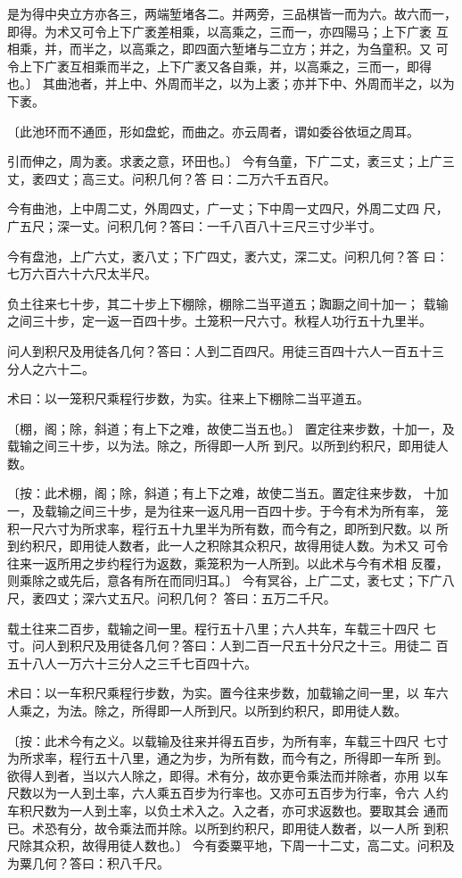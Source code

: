 \documentclass[a4paper,12pt,UTF8,twoside]{ctexbook}
\begin{document}
是为得中央立方亦各三，两端堑堵各二。并两旁，三品棋皆一而为六。故六而一， 即得。为术又可令上下广袤差相乘，以高乘之，三而一，亦四陽马；上下广袤 互相乘，并，而半之，以高乘之，即四面六堑堵与二立方；并之，为刍童积。又 可令上下广袤互相乘而半之，上下广袤又各自乘，并，以高乘之，三而一，即得 也。〕 其曲池者，并上中、外周而半之，以为上袤；亦并下中、外周而半之，以为 下袤。

〔此池环而不通匝，形如盘蛇，而曲之。亦云周者，谓如委谷依垣之周耳。

引而伸之，周为袤。求袤之意，环田也。〕 今有刍童，下广二丈，袤三丈；上广三丈，袤四丈；高三丈。问积几何？答 曰：二万六千五百尺。

今有曲池，上中周二丈，外周四丈，广一丈；下中周一丈四尺，外周二丈四 尺，广五尺；深一丈。问积几何？答曰：一千八百八十三尺三寸少半寸。

今有盘池，上广六丈，袤八丈；下广四丈，袤六丈，深二丈。问积几何？答 曰：七万六百六十六尺太半尺。

负土往来七十步，其二十步上下棚除，棚除二当平道五；踟蹰之间十加一； 载输之间三十步，定一返一百四十步。土笼积一尺六寸。秋程人功行五十九里半。

问人到积尺及用徒各几何？答曰：人到二百四尺。用徒三百四十六人一百五十三 分人之六十二。

术曰：以一笼积尺乘程行步数，为实。往来上下棚除二当平道五。

〔棚，阁；除，斜道；有上下之难，故使二当五也。〕 置定往来步数，十加一，及载输之间三十步，以为法。除之，所得即一人所 到尺。以所到约积尺，即用徒人数。

〔按：此术棚，阁；除，斜道；有上下之难，故使二当五。置定往来步数， 十加一，及载输之间三十步，是为往来一返凡用一百四十步。于今有术为所有率， 笼积一尺六寸为所求率，程行五十九里半为所有数，而今有之，即所到尺数。以 所到约积尺，即用徒人数者，此一人之积除其众积尺，故得用徒人数。为术又 可令往来一返所用之步约程行为返数，乘笼积为一人所到。以此术与今有术相 反覆，则乘除之或先后，意各有所在而同归耳。〕 今有冥谷，上广二丈，袤七丈；下广八尺，袤四丈；深六丈五尺。问积几何？ 答曰：五万二千尺。

载土往来二百步，载输之间一里。程行五十八里；六人共车，车载三十四尺 七寸。问人到积尺及用徒各几何？答曰：人到二百一尺五十分尺之十三。用徒二 百五十八人一万六十三分人之三千七百四十六。

术曰：以一车积尺乘程行步数，为实。置今往来步数，加载输之间一里，以 车六人乘之，为法。除之，所得即一人所到尺。以所到约积尺，即用徒人数。

〔按：此术今有之义。以载输及往来并得五百步，为所有率，车载三十四尺 七寸为所求率，程行五十八里，通之为步，为所有数，而今有之，所得即一车所 到。欲得人到者，当以六人除之，即得。术有分，故亦更令乘法而并除者，亦用 以车尺数以为一人到土率，六人乘五百步为行率也。又亦可五百步为行率，令六 人约车积尺数为一人到土率，以负土术入之。入之者，亦可求返数也。要取其会 通而已。术恐有分，故令乘法而并除。以所到约积尺，即用徒人数者，以一人所 到积尺除其众积，故得用徒人数也。〕 今有委粟平地，下周一十二丈，高二丈。问积及为粟几何？答曰：积八千尺。
\end{document}
